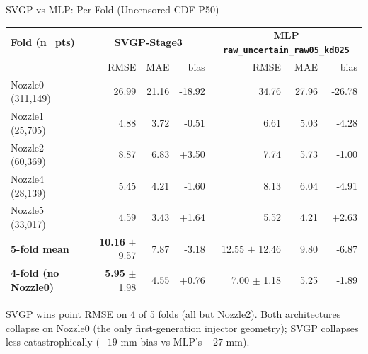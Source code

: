 \documentclass[UTF8,aspectratio=169]{ctexbeamer}
\newcommand{\good}[1]{\textcolor{green!45!black}{#1}}
\newcommand{\warn}[1]{\textcolor{red!65!black}{#1}}
\begin{document}
\begin{frame}{SVGP vs MLP: Per-Fold (Uncensored CDF P50)}
\footnotesize
\begin{center}
\renewcommand{\arraystretch}{1.12}
\setlength{\tabcolsep}{3pt}
\begin{tabular}{@{}lrrrrrr@{}}
\toprule
\textbf{Fold (n\_pts)} & \multicolumn{3}{c}{\textbf{SVGP-Stage3}} & \multicolumn{3}{c}{\textbf{MLP \texttt{raw\_uncertain\_raw05\_kd025}}} \\
 & RMSE & MAE & bias & RMSE & MAE & bias \\
\midrule
\rowcolor{warnrow}
Nozzle0 (311{,}149) & \warn{26.99} & 21.16 & -18.92 & 34.76 & 27.96 & -26.78 \\
Nozzle1 (25{,}705)  & \good{4.88}  & 3.72  & -0.51  & 6.61  & 5.03  & -4.28  \\
Nozzle2 (60{,}369)  & 8.87         & 6.83  & +3.50  & \good{7.74}  & 5.73  & -1.00 \\
Nozzle4 (28{,}139)  & \good{5.45}  & 4.21  & -1.60  & 8.13  & 6.04  & -4.91  \\
Nozzle5 (33{,}017)  & \good{4.59}  & 3.43  & +1.64  & 5.52  & 4.21  & +2.63  \\
\midrule
\textbf{5-fold mean} & \good{\textbf{10.16}} \(\pm\) 9.57 & 7.87 & -3.18 & 12.55 \(\pm\) 12.46 & 9.80 & -6.87 \\
\textbf{4-fold (no Nozzle0)} & \good{\textbf{5.95}} \(\pm\) 1.98 & 4.55 & +0.76 & 7.00 \(\pm\) 1.18 & 5.25 & -1.89 \\
\bottomrule
\end{tabular}
\end{center}

\vspace{0.4em}
\small
SVGP wins point RMSE on 4 of 5 folds (all but Nozzle2). Both architectures collapse on
Nozzle0 (the only first-generation injector geometry); SVGP collapses less catastrophically
(\(-19\) mm bias vs MLP's \(-27\) mm).
\end{frame}
\end{document}
